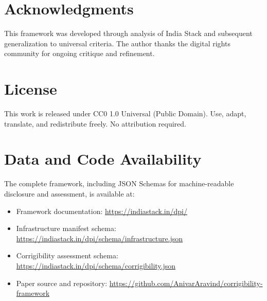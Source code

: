 \section*{Acknowledgments}

This framework was developed through analysis of India Stack and subsequent generalization to universal criteria. The author thanks the digital rights community for ongoing critique and refinement.

\section*{License}

This work is released under CC0 1.0 Universal (Public Domain). Use, adapt, translate, and redistribute freely. No attribution required.

\section*{Data and Code Availability}

The complete framework, including JSON Schemas for machine-readable disclosure and assessment, is available at:

\begin{itemize}
    \item Framework documentation: \url{https://indiastack.in/dpi/}
    \item Infrastructure manifest schema: \url{https://indiastack.in/dpi/schema/infrastructure.json}
    \item Corrigibility assessment schema: \url{https://indiastack.in/dpi/schema/corrigibility.json}
    \item Paper source and repository: \url{https://github.com/AnivarAravind/corrigibility-framework}
\end{itemize}

\appendix
